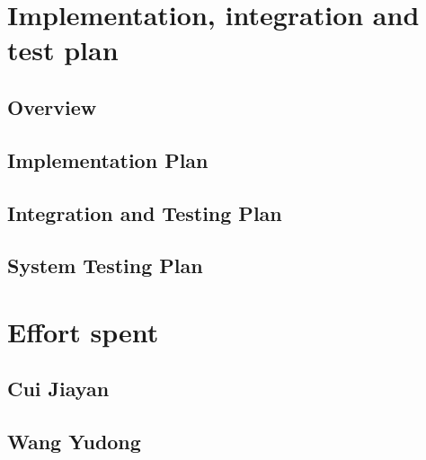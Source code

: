\documentclass[10pt,english, openany]{book}
\begin{document}
\chapter{Implementation, integration and test plan}

\section{Overview}



\section{Implementation Plan}



\section{Integration and Testing Plan}



\section{System Testing Plan}



\chapter{Effort spent}

\section{Cui Jiayan}



\section{Wang Yudong}




\pagebreak
\end{document}
